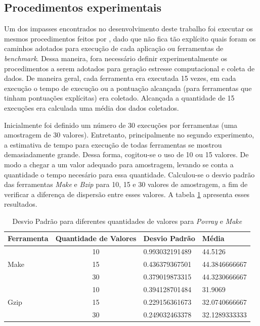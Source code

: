 \subsection{Procedimentos experimentais}
Um dos impasses encontrados no desenvolvimento deste trabalho foi executar os mesmos procedimentos feitos por , dado que não fica tão explícito quais foram os caminhos adotados para execução de cada aplicação ou ferramentas de \textit{benchmark}. Dessa maneira, fora necessário definir experimentalmente os procedimentos a serem adotados para geração estresse computacional e coleta de dados. De maneira geral, cada ferramenta era executada 15 vezes, em cada execução o tempo de execução ou a pontuação alcançada (para ferramentas que tinham pontuações explícitas) era coletado. Alcançada a quantidade de 15 execuções era calculada uma média dos dados coletados.

Inicialmente foi definido um número de 30 execuções por ferramentas (uma amostragem de 30 valores). Entretanto, principalmente no segundo experimento, a estimativa de tempo para execução de todas ferramentas se mostrou demasiadamente grande. Dessa forma, cogitou-se o uso de 10 ou 15 valores. De modo a chegar a um valor adequado para amostragem, levando se conta a quantidade o tempo necesário para essa quantidade. Calculou-se o desvio padrão das ferramentas \textit{Make} e \textit{Bzip} para 10, 15 e 30 valores de amostragem, a fim de verificar a diferença de dispersão entre esses valores. A tabela \ref{desvio} apresenta esses resultados.     

\begin{table}[!h]
\centering
\caption{Desvio Padrão para diferentes quantidades de valores para \textit{Povray} e \textit{Make}}
\label{desvio}
\begin{tabular}{|l|c|l|l|}
\hline
Ferramenta            & \multicolumn{1}{l|}{Quantidade de Valores} & Desvio Padrão  & Média         \\ \hline
\multirow{3}{*}{Make} & 10                                         & 0.993032191489 & 44.5126       \\ \cline{2-4} 
                      & 15                                         & 0.436379367501 & 44.3846666667 \\ \cline{2-4} 
                      & 30                                         & 0.379019873315 & 44.3230666667 \\ \hline
\multirow{3}{*}{Gzip} & 10                                         & 0.394128701484 & 31.9069       \\ \cline{2-4} 
                      & 15                                         & 0.229156361673 & 32.0740666667 \\ \cline{2-4} 
                      & 30                                         & 0.249032463378 & 32.1289333333 \\ \hline
\end{tabular}
\end{table}


